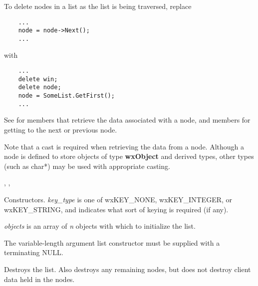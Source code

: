 To delete nodes in a list as the list is being traversed, replace

\begin{verbatim}
    ...
    node = node->Next();
    ...
\end{verbatim}

with

\begin{verbatim}
    ...
    delete win;
    delete node;
    node = SomeList.GetFirst();
    ...
\end{verbatim}

See  for members that retrieve the data associated with a node, and
members for getting to the next or previous node.

Note that a cast is required when retrieving the data from a node.  Although a
node is defined to store objects of type {\bf wxObject} and derived types, other
types (such as char*) may be used with appropriate casting.


, ,







Constructors. {\it key\_type} is one of wxKEY\_NONE, wxKEY\_INTEGER, or wxKEY\_STRING,
and indicates what sort of keying is required (if any).

{\it objects} is an array of {\it n} objects with which to initialize the list.

The variable-length argument list constructor must be supplied with a
terminating NULL.



Destroys the list.  Also destroys any remaining nodes, but does not destroy
client data held in the nodes.



